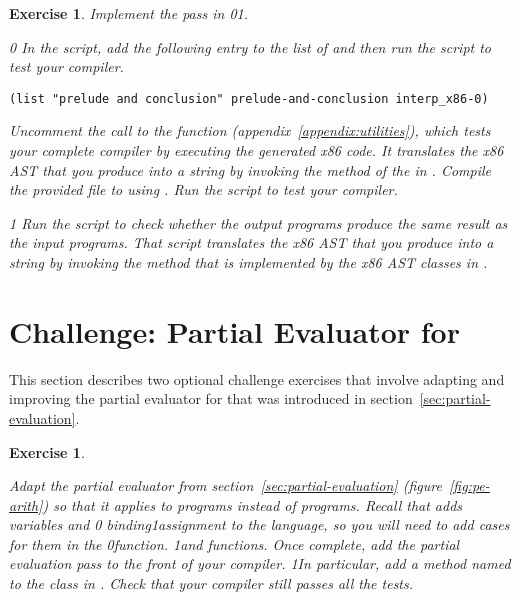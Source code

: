 \documentclass[7x10]{TimesAPriori_MIT}%
\def\racketEd{0}
\def\pythonEd{1}
\def\edition{1}
\newcommand{\racket}[1]{{\if\edition\racketEd{#1}\fi}}
\newcommand{\pythonColor}[0]{}
\newcommand{\python}[1]{{\if\edition\pythonEd\pythonColor #1\fi}}
\newtheorem{exercise}[theorem]{Exercise}
\numberwithin{theorem}{chapter}
\numberwithin{definition}{chapter}
\numberwithin{equation}{chapter}
\begin{document}
\begin{exercise}\normalfont\normalsize
%
Implement the  pass in
\racket{}\python{}.
%
{\if\edition\racketEd
In the  script, add the following entry to the
list of  and then run the script to test your compiler.
\begin{lstlisting}
(list "prelude and conclusion" prelude-and-conclusion interp_x86-0)
\end{lstlisting}
%  
Uncomment the call to the  function
(appendix~\ref{appendix:utilities}), which tests your complete
compiler by executing the generated x86 code. It translates the x86
AST that you produce into a string by invoking the 
method of the  in . Compile
the provided  file to  using
. Run the script to test your compiler.
%
\fi}
{\if\edition\pythonEd\pythonColor
%
Run the  script to check whether the output
programs produce the same result as the input programs. That script
translates the x86 AST that you produce into a string by invoking the
 method that is implemented by the x86 AST classes in
.
%
\fi}

\end{exercise}


\section{Challenge: Partial Evaluator for \LangVar{}}
\label{sec:pe-Lvar}

This section describes two optional challenge exercises that involve
adapting and improving the partial evaluator for \LangInt{} that was
introduced in section~\ref{sec:partial-evaluation}.

\begin{exercise}\label{ex:pe-Lvar}
\normalfont\normalsize
  
Adapt the partial evaluator from section~\ref{sec:partial-evaluation}
(figure~\ref{fig:pe-arith}) so that it applies to \LangVar{} programs
instead of \LangInt{} programs. Recall that \LangVar{} adds variables and
%
\racket{ binding}\python{assignment}
%
to the \LangInt{} language, so you will need to add cases for them in
the 
%
\racket{function.}
%
\python{and  functions.}
%
Once complete, add the partial evaluation pass to the front of your
compiler.
\python{In particular, add a method named  to
the \code{Compiler} class in \code{compiler.py}.}
Check that your compiler still passes all the
tests.

\end{exercise}
\end{document}
